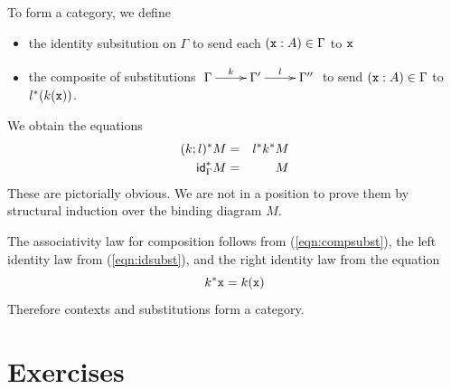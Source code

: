 \documentclass[runningheads,12pt]{llncs}
\begin{document}
To form a category, we define
\begin{itemize}
\item the identity subsitution on $\Gamma$ to send each $(\mathtt{x}:A) \in \Gamma$ to $\mathtt{x}$
\item the composite of substitutions
  \begin{math}
    \xymatrix{
 \Gamma \ar[r]^-{k} & \Gamma' \ar[r]^-{l} & \Gamma''
}
  \end{math}
to send $(\mathtt{x}:A) \in \Gamma$ to $l^{*}(k(\mathtt{x}))$.
\end{itemize}
We obtain the equations
\begin{eqnarray}
  (k;l)^{*}M & = & l^{*}k^{*}M  \label{eqn:compsubst} \\
  \mathsf{id}_{\Gamma}^{*}M & = & M \label{eqn:idsubst}
\end{eqnarray}
These are pictorially obvious.  We are not in a position to prove them by structural induction over the binding diagram $M$.

The associativity law for composition follows from (\ref{eqn:compsubst}), the left identity law from (\ref{eqn:idsubst}), and the right identity law from 
the equation
\begin{displaymath}
  k^{*} \mathtt{x} = k(\mathtt{x})
\end{displaymath}
Therefore contexts and substitutions form a category.




\section{Exercises}
\end{document}
